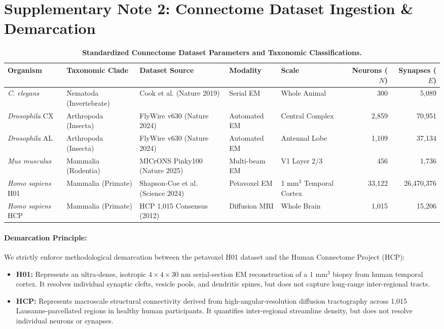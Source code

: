\documentclass[10pt,letterpaper]{article}
\begin{document}
\newpage

\section{Supplementary Note 2: Connectome Dataset Ingestion \& Demarcation}

\begin{table}[h]
\centering
\small
\caption{\textbf{Standardized Connectome Dataset Parameters and Taxonomic Classifications.}}
\begin{tabular}{lllllrr}
\toprule
\textbf{Organism} & \textbf{Taxonomic Clade} & \textbf{Dataset Source} & \textbf{Modality} & \textbf{Scale} & \textbf{Neurons ($N$)} & \textbf{Synapses ($E$)} \\
\midrule
\textit{C. elegans} & Nematoda (Invertebrate) & Cook et al. (Nature 2019) & Serial EM & Whole Animal & 300 & 5,089 \\
\textit{Drosophila} CX & Arthropoda (Insecta) & FlyWire v630 (Nature 2024) & Automated EM & Central Complex & 2,859 & 70,951 \\
\textit{Drosophila} AL & Arthropoda (Insecta) & FlyWire v630 (Nature 2024) & Automated EM & Antennal Lobe & 1,109 & 37,134 \\
\textit{Mus musculus} & Mammalia (Rodentia) & MICrONS Pinky100 (Nature 2025) & Multi-beam EM & V1 Layer 2/3 & 456 & 1,736 \\
\textit{Homo sapiens} H01 & Mammalia (Primate) & Shapson-Coe et al. (Science 2024) & Petavoxel EM & 1 mm$^3$ Temporal Cortex & 33,122 & 26,470,376 \\
\textit{Homo sapiens} HCP & Mammalia (Primate) & HCP 1,015 Consensus (2012) & Diffusion MRI & Whole Brain & 1,015 & 15,206 \\
\bottomrule
\end{tabular}
\end{table}

\paragraph{Demarcation Principle:}
We strictly enforce methodological demarcation between the petavoxel H01 dataset and the Human Connectome Project (HCP):
\begin{itemize}[leftmargin=*]
    \item \textbf{H01:} Represents an ultra-dense, isotropic $4 \times 4 \times 30\text{ nm}$ serial-section EM reconstruction of a $1\text{ mm}^3$ biopsy from human temporal cortex. It resolves individual synaptic clefts, vesicle pools, and dendritic spines, but does not capture long-range inter-regional tracts.
    \item \textbf{HCP:} Represents macroscale structural connectivity derived from high-angular-resolution diffusion tractography across 1,015 Lausanne-parcellated regions in healthy human participants. It quantifies inter-regional streamline density, but does not resolve individual neurons or synapses.
\end{itemize}
\end{document}
